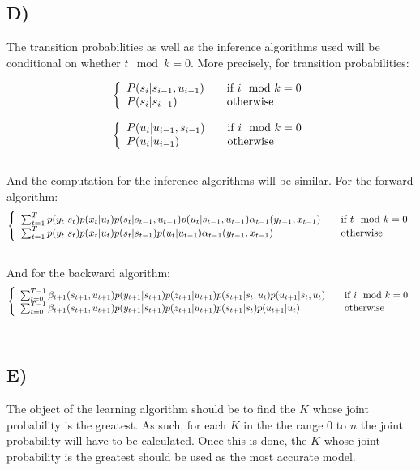 \documentclass{report}
\begin{document}
\subsection*{D)}
The transition probabilities as well as the inference algorithms used will be
conditional on whether $t\mod{k}=0$. More precisely, for transition probabilities:

\begin{equation}
  \left\{
  \begin{array}{l l}
    P(s_i | s_{i-1}, u_{i-1}) & \quad \text{if } i \mod k = 0 \\
    P(s_i | s_{i-1}) & \quad \text{otherwise}

  \end{array} \right.
\end{equation}

\begin{equation}
  \left\{
  \begin{array}{l l}
    P(u_i | u_{i-1}, s_{i-1}) & \quad \text{if } i \mod k = 0 \\
    P(u_i | u_{i-1}) & \quad \text{otherwise}

  \end{array} \right.
\end{equation}\\
And the computation for the inference algorithms will be similar. For the forward
algorithm:
\begin{equation}
  \left\{
  \begin{array}{l l}
  \sum_{t = 1}^T p(y_t | s_t) p(x_t | u_t) p(s_t | s_{t-1}, u_{t-1}) p(u_t | s_{t-1}, u_{t-1}) \alpha_{t-1}(y_{t-1}, x_{t-1}) & \quad \text{if } t \mod k = 0 \\
  \sum_{t = 1}^T p(y_t | s_t) p(x_t | u_t) p(s_t | s_{t-1}) p(u_t | u_{t-1}) \alpha_{t-1}(y_{t-1}, x_{t-1}) & \quad \text{otherwise}

  \end{array} \right.
\end{equation}\\
And for the backward algorithm:
\begin{equation}
  \left\{
  \begin{array}{l l}
  \sum_{t=0}^{T-1} \beta_{t+1}(s_{t+1}, u_{t+1}) p(y_{t+1} | s_{t+1}) p(z_{t+1} | u_{t+1}) p(s_{t+1} | s_t, u_t) p(u_{t+1} | s_t, u_t) & \quad \text{if } i \mod k = 0 \\
  \sum_{t=0}^{T-1} \beta_{t+1}(s_{t+1}, u_{t+1}) p(y_{t+1} | s_{t+1}) p(z_{t+1} | u_{t+1}) p(s_{t+1} | s_t) p(u_{t+1} | u_t) & \quad \text{otherwise}

  \end{array} \right.
\end{equation}\\
\subsection*{E)}
The object of the learning algorithm should be to find the $K$ whose joint probability
is the greatest. As such, for each $K$ in the the range $0$ to $n$ the joint probability
will have to be calculated. Once this is done, the $K$ whose joint probability is the
greatest should be used as the most accurate model.
\end{document}
